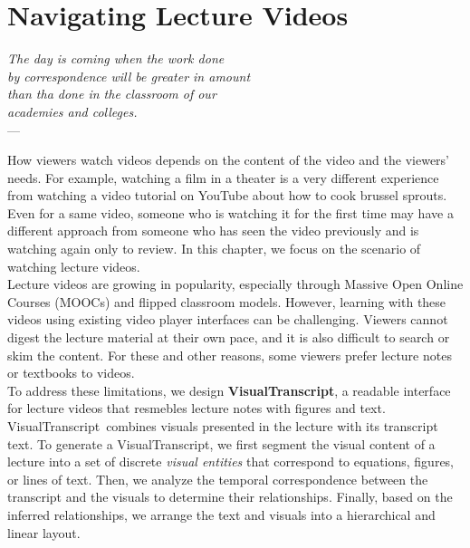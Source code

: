 \newcommand{\systemname}[0]{VisualTranscript}


\chapter{Navigating Lecture Videos} %
\label{ch:visualtranscript} %
%
\begin{flushright}{\slshape    
The day is coming when the work done\\
by correspondence will be greater in amount\\
than tha done in the classroom of our\\
academies and colleges.} \\ \medskip
---  \citep{harper:1885}
\end{flushright}
How viewers watch videos depends on the content of the video and the viewers'
needs. For example, watching a film in a theater is a very different experience
from watching a video tutorial on YouTube about how to cook brussel sprouts.
Even for a same video, someone who is watching it for the first time may have a
different approach from someone who has seen the video previously and is
watching again only to review. In this chapter, we focus on the scenario of
watching lecture videos. \\

Lecture videos are growing in popularity, especially through Massive Open Online Courses
(MOOCs) and flipped classroom models.
However, learning with these videos using existing video player interfaces can
be challenging. Viewers cannot digest the lecture material at their
own pace, and it is also difficult to search or skim the content. For these and other
reasons, some viewers prefer lecture notes or textbooks to videos.\\

To address these limitations, we design \textbf{\systemname}, a readable
interface for lecture videos that resmebles lecture notes with figures and text.
\systemname\ combines visuals presented in the lecture
with its transcript text. To generate a \systemname, we first segment the visual content
of a lecture into a set of discrete \emph{visual entities} that correspond to equations, figures, or lines of text. Then, we analyze
the temporal correspondence between the transcript and the visuals to determine their relationships. Finally, based on the inferred relationships, we arrange the text and visuals into a hierarchical and linear layout. \\

